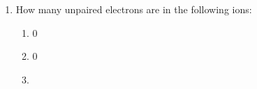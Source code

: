 \documentclass[12pt]{article}
\begin{document}
\begin{enumerate}
\begin{enumerate}
        \begin{center}
          :   \\
          :  
        \end{center}

      \item {}, 

        \begin{center}
          :   \\
          :  
        \end{center}

      \item {}, 

        \begin{center}
          :   \\
          :  
        \end{center}

      \item {}. 

        \begin{center}
          :   \\
          :  
        \end{center}

    \end{enumerate}

    \setcounter{enumi}{51}

  \item How many unpaired electrons are in the following ions:

    \begin{enumerate}

      \item {}

        \begin{center}
          0
        \end{center}

      \item {}

        \begin{center}
          0
        \end{center}

      \item {}


\end{enumerate}
\end{enumerate}
\end{document}
